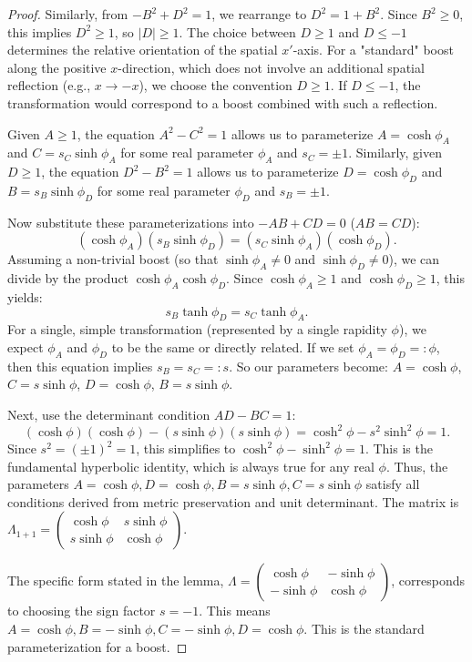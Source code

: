 \documentclass{amsart}
\theoremstyle{definition}
\theoremstyle{remark}
\begin{document}
\begin{proof}
  Similarly, from $-B^2 + D^2 = 1$, we rearrange to $D^2 = 1 + B^2$. Since $B^2 \geq 0$, this implies $D^2 \geq 1$, so $|D| \geq 1$.
  The choice between $D \geq 1$ and $D \leq -1$ determines the relative orientation of the spatial $x'$-axis. For a "standard" boost along the positive $x$-direction, which does not involve an additional spatial reflection (e.g., $x \to -x$), we choose the convention $D \geq 1$. If $D \leq -1$, the transformation would correspond to a boost combined with such a reflection.

  Given $A \geq 1$, the equation $A^2 - C^2 = 1$ allows us to parameterize $A = \cosh\phi_A$ and $C = s_C \sinh\phi_A$ for some real parameter $\phi_A$ and $s_C = \pm 1$.
  Similarly, given $D \geq 1$, the equation $D^2 - B^2 = 1$ allows us to parameterize $D = \cosh\phi_D$ and $B = s_B \sinh\phi_D$ for some real parameter $\phi_D$ and $s_B = \pm 1$.

  Now substitute these parameterizations into $-AB + CD = 0$ ($AB = CD$):
  \[ (\cosh\phi_A)(s_B \sinh\phi_D) = (s_C \sinh\phi_A)(\cosh\phi_D). \]
  Assuming a non-trivial boost (so that $\sinh\phi_A \neq 0$ and $\sinh\phi_D \neq 0$), we can divide by the product $\cosh\phi_A \cosh\phi_D$. Since $\cosh\phi_A \ge 1$ and $\cosh\phi_D \ge 1$, this yields:
  \[ s_B \tanh\phi_D = s_C \tanh\phi_A. \]
  For a single, simple transformation (represented by a single rapidity $\phi$), we expect $\phi_A$ and $\phi_D$ to be the same or directly related. If we set $\phi_A = \phi_D =: \phi$, then this equation implies $s_B = s_C =: s$.
  So our parameters become: $A = \cosh\phi$, $C = s \sinh\phi$, $D = \cosh\phi$, $B = s \sinh\phi$.

  Next, use the determinant condition $AD-BC=1$:
  \[ (\cosh\phi)(\cosh\phi) - (s \sinh\phi)(s \sinh\phi) = \cosh^2\phi - s^2 \sinh^2\phi = 1. \]
  Since $s^2 = (\pm 1)^2 = 1$, this simplifies to $\cosh^2\phi - \sinh^2\phi = 1$. This is the fundamental hyperbolic identity, which is always true for any real $\phi$.
  Thus, the parameters $A=\cosh\phi, D=\cosh\phi, B=s\sinh\phi, C=s\sinh\phi$ satisfy all conditions derived from metric preservation and unit determinant.
  The matrix is $\Lambda_{1+1} = \begin{pmatrix} \cosh\phi & s\sinh\phi \\ s\sinh\phi & \cosh\phi \end{pmatrix}$.

  The specific form stated in the lemma, $\Lambda = \begin{pmatrix} \cosh\phi & -\sinh\phi \\ -\sinh\phi & \cosh\phi \end{pmatrix}$, corresponds to choosing the sign factor $s=-1$.
  This means $A = \cosh\phi, B = -\sinh\phi, C = -\sinh\phi, D = \cosh\phi$. This is the standard parameterization for a boost.


\end{proof}
\end{document}
